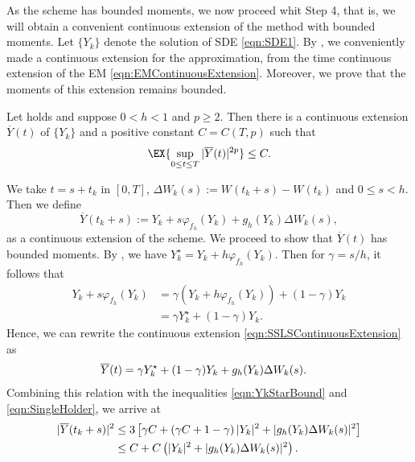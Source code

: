 	As the \SM scheme has bounded moments, we now proceed whit Step 4, that is,  we will obtain a convenient 
continuous extension of the \SM method with bounded moments. 
Let $\{Y_k\}$ denote the \SM solution of SDE \eqref{eqn:SDE1}.
By , we conveniently made a continuous extension for the \SM approximation, from the 
time continuous extension of the EM \eqref{eqn:EMContinuousExtension}.
Moreover, we prove that the  moments of this extension remains bounded.
\begin{corollary}\label{col:ContinuousExtBoundedMoments}
	Let  holds and suppose  $0<h<1$ and $p\geq 
	2$. Then there is a continuous extension $\overline{Y}(t)$ of $\{Y_k\}$  and a positive constant $C=C(T,p)$ such 
	that
	\begin{equation*}
		\EX{\sup_{0\leq t \leq T} |\overline{Y}(t)|^{2p} }
		\leq C.
	\end{equation*}
\end{corollary}
	\begin{pf}
		We take $t=s+t_k$ in $ [0,T]$, $\Delta W_k(s):= W(t_k+s)- W(t_k)$ and $0\leq s <h$.
		Then we define 
		\begin{equation}\label{eqn:SSLSContinuousExtension}
			\overline{Y}(t_k+s):= Y_k + s \varphi_{f_h}(Y_k) + g_h(Y_k)\Delta W_k(s),
		\end{equation}
		as a continuous extension of the \SM scheme. We proceed to show that $\overline{Y}(t)$ has bounded moments.
		By , we have $Y_k^{\star}= Y_k + h \varphi_{f_h}(Y_k)$. 
		Then for $\gamma = s/h$, it follows that
		\begin{align*}
			Y_k + s \varphi_{f_h}(Y_k)
			&= 
			\gamma (Y_k + h \varphi_{f_h}(Y_k)) +(1-\gamma)Y_k\\
			&=
			\gamma Y_k^{\star} + (1-\gamma)Y_k.
		\end{align*}
		Hence, we can rewrite the continuous extension \eqref{eqn:SSLSContinuousExtension} as
		\begin{align}
			\overline{Y}(t) &=
			\gamma Y^{\star}_k + (1-\gamma) Y_k +g_h(Y_k) \Delta W_k(s). %
			\notag
		\end{align}
		Combining this relation with  the inequalities \eqref{eqn:YkStarBound} and \eqref{eqn:SingleHolder}, we arrive 
		at
		\begin{align}
			|\overline{Y}(t_k+s) |^2 
			&\leq
				3\left[
					\gamma C
					+
					\left(
						\gamma C +1 - \gamma
					\right)
					|Y_k|^2
					+
					|g_h(Y_k)\Delta W_k(s)|^2
			\right] \notag\\
		&\leq
			C
			+
			C
			\left(
				|Y_k|^2 + |g_h(Y_k)\Delta W_k(s)|^2
			\right).
		\notag
		\end{align}
	\end{pf}
